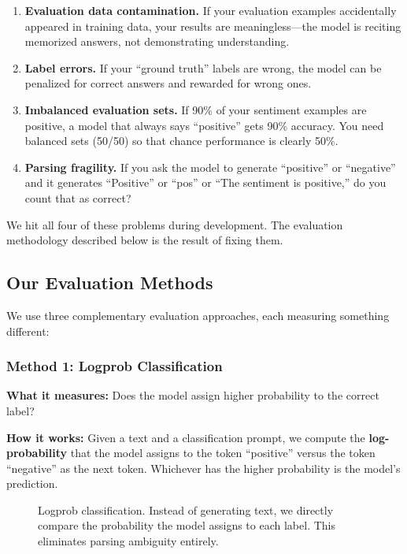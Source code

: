 \documentclass[11pt,a4paper]{article}
\begin{document}
\begin{enumerate}
    \item \textbf{Evaluation data contamination.} If your evaluation examples accidentally appeared in training data, your results are meaningless---the model is reciting memorized answers, not demonstrating understanding.
    \item \textbf{Label errors.} If your ``ground truth'' labels are wrong, the model can be penalized for correct answers and rewarded for wrong ones.
    \item \textbf{Imbalanced evaluation sets.} If 90\% of your sentiment examples are positive, a model that always says ``positive'' gets 90\% accuracy. You need balanced sets (50/50) so that chance performance is clearly 50\%.
    \item \textbf{Parsing fragility.} If you ask the model to generate ``positive'' or ``negative'' and it generates ``Positive'' or ``pos'' or ``The sentiment is positive,'' do you count that as correct?
\end{enumerate}

We hit all four of these problems during development. The evaluation methodology described below is the result of fixing them.

\subsection{Our Evaluation Methods}

We use three complementary evaluation approaches, each measuring something different:

\subsubsection{Method 1: Logprob Classification}

\textbf{What it measures:} Does the model assign higher probability to the correct label?

\textbf{How it works:} Given a text and a classification prompt, we compute the \textbf{log-probability} that the model assigns to the token ``positive'' versus the token ``negative'' as the next token. Whichever has the higher probability is the model's prediction.

\begin{figure}[H]
\centering
{}
\caption{Logprob classification. Instead of generating text, we directly compare the probability the model assigns to each label. This eliminates parsing ambiguity entirely.}
\label{fig:logprob}
\end{figure}
\end{document}
